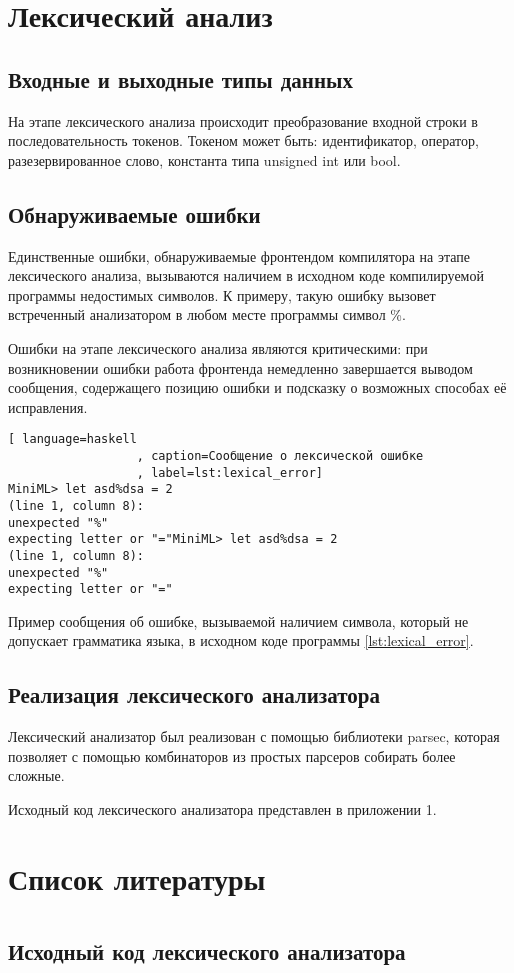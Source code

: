 \documentclass[a4paper,12pt]{article}
\numberwithin{equation}{section}
\begin{document}
\section{Лексический анализ}
\subsection{Входные и выходные типы данных}
На этапе лексического анализа происходит преобразование входной строки
в последовательность токенов. Токеном может быть: идентификатор, оператор,
разезервированное слово, константа типа unsigned int или bool.

\subsection{Обнаруживаемые ошибки}
Единственные ошибки, обнаруживаемые фронтендом компилятора на этапе
лексического анализа, вызываются наличием в исходном коде компилируемой
программы недостимых символов. К примеру, такую ошибку вызовет встреченный
анализатором в любом месте программы символ \%.


Ошибки на этапе лексического анализа являются критическими: при возникновении
ошибки работа фронтенда немедленно завершается выводом сообщения, содержащего
позицию ошибки и подсказку о возможных способах её исправления.

\begin{lstlisting}[ language=haskell
                  , caption=Сообщение о лексической ошибке
                  , label=lst:lexical_error]
MiniML> let asd%dsa = 2
(line 1, column 8):
unexpected "%"
expecting letter or "="MiniML> let asd%dsa = 2
(line 1, column 8):
unexpected "%"
expecting letter or "="
\end{lstlisting}

Пример сообщения об ошибке, вызываемой наличием символа, который не
допускает грамматика языка, в исходном коде программы \ref{lst:lexical_error}.

\subsection{Реализация лексического анализатора}
Лексический анализатор был реализован с помощью библиотеки parsec,
которая позволяет с помощью комбинаторов из простых парсеров собирать
более сложные.


Исходный код лексического анализатора представлен в приложении 1.

\section{Список литературы}
\printbibliography[heading=none]

\section*{} 
\subsection*{Исходный код лексического анализатора}

\clearpage
\end{document}
